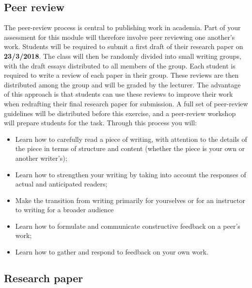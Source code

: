 \documentclass[12pt,a4paper]{article}
\begin{document}
\subsection*{Peer review}


The peer-review process is central to publishing work in academia. Part of your assessment for this module will therefore involve peer reviewing one another's work. Students will be required to submit a first draft of their research paper on \textbf{23/3/2018}. The class will then be randomly divided into small writing groups, with the draft essays distributed to all members of the group. Each student is required to write a review of each paper in their group. These reviews are then distributed among the group and will be graded by the lecturer. The advantage of this approach is that students can use these reviews to improve their work when redrafting their final research paper for submission. A full set of peer-review guidelines will be distributed before this exercise, and a peer-review workshop will prepare students for the task. Through this process you will:

\begin{itemize}
	\item Learn how to carefully read a piece of writing, with attention to the details of the piece in terms of structure and content (whether the piece is your own or another writer's);
	\item Learn how to strengthen your writing by taking into account the responses of actual and anticipated readers;
	\item Make the transition from writing primarily for yourselves or for an instructor to writing for a broader audience
	\item Learn how to formulate and communicate constructive feedback on a peer's work;
	\item Learn how to gather and respond to feedback on your own work.
\end{itemize}

\subsection*{Research paper}
\end{document}
